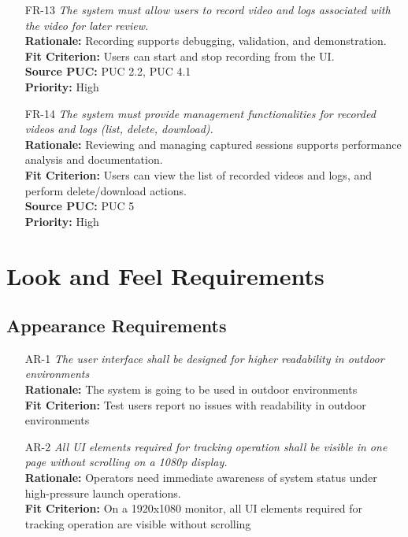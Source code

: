 \documentclass[12pt]{article}
\begin{document}
\begin{itemize}[leftmargin=*]
  \item[FR-13] \emph{The system must allow users to record video and logs associated
          with the video for later review.}\\[2mm]
        \textbf{Rationale:} Recording supports debugging, validation, and demonstration.\\
        \textbf{Fit Criterion:} Users can start and stop recording from the UI.\\
        \textbf{Source PUC:} PUC 2.2, PUC 4.1 \\
        \textbf{Priority:} High

  \item[FR-14] \emph{The system must provide management functionalities for recorded
          videos and logs (list, delete, download).}\\[2mm]
        \textbf{Rationale:} Reviewing and managing captured sessions supports performance analysis and documentation.\\
        \textbf{Fit Criterion:} Users can view the list of recorded videos and logs, and perform delete/download actions.\\
        \textbf{Source PUC:} PUC 5 \\
        \textbf{Priority:} High

\end{itemize}
\section{Look and Feel Requirements}
\subsection{Appearance Requirements}
\begin{itemize}[leftmargin=*]
  \item[AR-1] \emph{The user interface shall be designed for higher readability in
          outdoor environments}\\[2mm]
        \textbf{Rationale:} The system is going to be used in outdoor environments\\
        \textbf{Fit Criterion:} Test users report no issues with readability in outdoor environments

  \item[AR-2] \emph{All UI elements required for tracking operation shall be visible in
          one page without scrolling on a 1080p display.}\\[2mm]
        \textbf{Rationale:} Operators need immediate awareness of system
        status under high-pressure launch operations.\\
        \textbf{Fit Criterion:} On a 1920x1080 monitor, all UI elements required for tracking operation are visible without scrolling
\end{itemize}
\end{document}

